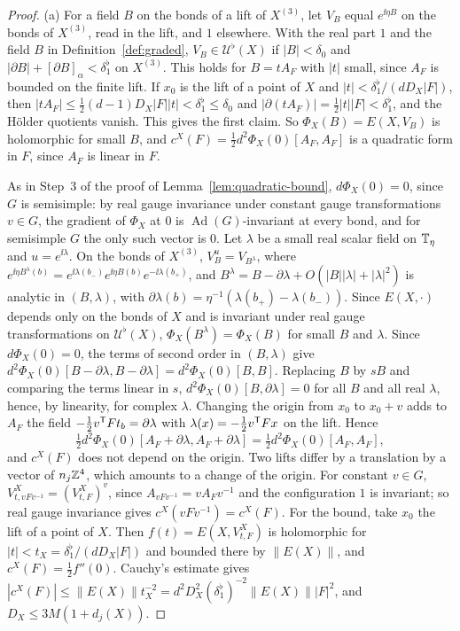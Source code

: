 \begin{proof}
(a) For a field $B$ on the bonds of a lift of $X^{(3)}$, let $V_B$ equal $e^{\ii\eta B}$ on the bonds of $X^{(3)}$, read in the lift, and $1$ elsewhere. With the real part $1$ and the field $B$ in Definition~\ref{def:graded}, $V_B\in\mathcal U^\flat(X)$ if $|B|<\delta_0$ and $|\partial B|+[\partial B]_\alpha<\delta_1^\flat$ on $X^{(3)}$. This holds for $B=tA_F$ with $|t|$ small, since $A_F$ is bounded on the finite lift. If $x_0$ is the lift of a point of $X$ and $|t|<\delta_1^\flat/(dD_X|F|)$, then $|tA_F|\le\frac12(d-1)D_X|F||t|<\delta_1^\flat\le\delta_0$ and $|\partial(tA_F)|=\frac12|t||F|<\delta_1^\flat$, and the H\"older quotients vanish. This gives the first claim. So $\Phi_X(B)=E(X,V_B)$ is holomorphic for small $B$, and $c^X(F)=\frac12d^2\Phi_X(0)[A_F,A_F]$ is a quadratic form in $F$, since $A_F$ is linear in $F$.

As in Step~3 of the proof of Lemma~\ref{lem:quadratic-bound}, $d\Phi_X(0)=0$, since $G$ is semisimple: by real gauge invariance under constant gauge transformations $v\in G$, the gradient of $\Phi_X$ at $0$ is $\operatorname{Ad}(G)$-invariant at every bond, and for semisimple $G$ the only such vector is $0$. Let $\lambda$ be a small real scalar field on $\mathbb T_\eta$ and $u=e^{\ii\lambda}$. On the bonds of $X^{(3)}$, $V_B^u=V_{B^\lambda}$, where $e^{\ii\eta B^\lambda(b)}=e^{\ii\lambda(b_-)}e^{\ii\eta B(b)}e^{-\ii\lambda(b_+)}$, and $B^\lambda=B-\partial\lambda+O(|B||\lambda|+|\lambda|^2)$ is analytic in $(B,\lambda)$, with $\partial\lambda(b)=\eta^{-1}(\lambda(b_+)-\lambda(b_-))$. Since $E(X,\cdot)$ depends only on the bonds of $X$ and is invariant under real gauge transformations on $\mathcal U^\flat(X)$, $\Phi_X(B^\lambda)=\Phi_X(B)$ for small $B$ and $\lambda$. Since $d\Phi_X(0)=0$, the terms of second order in $(B,\lambda)$ give $d^2\Phi_X(0)[B-\partial\lambda,B-\partial\lambda]=d^2\Phi_X(0)[B,B]$. Replacing $B$ by $sB$ and comparing the terms linear in $s$, $d^2\Phi_X(0)[B,\partial\lambda]=0$ for all $B$ and all real $\lambda$, hence, by linearity, for complex $\lambda$. Changing the origin from $x_0$ to $x_0+v$ adds to $A_F$ the field $-\frac12v^{\sf T}Ft_b=\partial\lambda$ with $\lambda(x)=-\frac12v^{\sf T}Fx$ on the lift. Hence
\[
\tfrac12d^2\Phi_X(0)[A_F+\partial\lambda,A_F+\partial\lambda]=\tfrac12d^2\Phi_X(0)[A_F,A_F],
\]
and $c^X(F)$ does not depend on the origin. Two lifts differ by a translation by a vector of $n_j\mathbb Z^4$, which amounts to a change of the origin. For constant $v\in G$, $V^X_{t,vFv^{-1}}=(V^X_{t,F})^v$, since $A_{vFv^{-1}}=vA_Fv^{-1}$ and the configuration $1$ is invariant; so real gauge invariance gives $c^X(vFv^{-1})=c^X(F)$. For the bound, take $x_0$ the lift of a point of $X$. Then $f(t)=E(X,V^X_{t,F})$ is holomorphic for $|t|<t_X=\delta_1^\flat/(dD_X|F|)$ and bounded there by $\|E(X)\|$, and $c^X(F)=\frac12f''(0)$. Cauchy's estimate gives $|c^X(F)|\le\|E(X)\|t_X^{-2}=d^2D_X^2(\delta_1^\flat)^{-2}\|E(X)\||F|^2$, and $D_X\le3M(1+d_j(X))$.


\end{proof}

